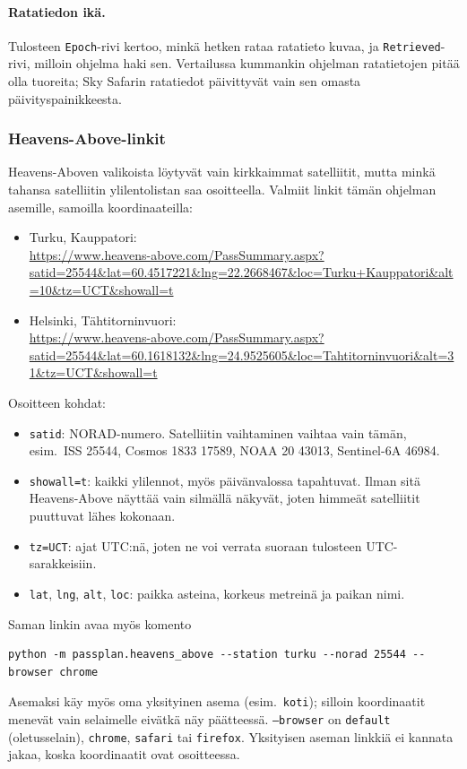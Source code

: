 \documentclass[a4paper,11pt]{article}
\newcommand{\koodi}[1]{\texttt{#1}}
\begin{document}
\paragraph{Ratatiedon ikä.} Tulosteen \koodi{Epoch}-rivi kertoo, minkä hetken rataa
ratatieto kuvaa, ja \koodi{Retrieved}-rivi, milloin ohjelma haki sen. Vertailussa kummankin
ohjelman ratatietojen pitää olla tuoreita; Sky Safarin ratatiedot päivittyvät vain sen omasta
päivityspainikkeesta.

\subsubsection*{Heavens-Above-linkit}
Heavens-Aboven valikoista löytyvät vain kirkkaimmat satelliitit, mutta minkä tahansa
satelliitin ylilentolistan saa osoitteella. Valmiit linkit tämän ohjelman asemille, samoilla
koordinaateilla:
\begin{itemize}
  \item Turku, Kauppatori:\\
    \url{https://www.heavens-above.com/PassSummary.aspx?satid=25544&lat=60.4517221&lng=22.2668467&loc=Turku+Kauppatori&alt=10&tz=UCT&showall=t}
  \item Helsinki, Tähtitorninvuori:\\
    \url{https://www.heavens-above.com/PassSummary.aspx?satid=25544&lat=60.1618132&lng=24.9525605&loc=Tahtitorninvuori&alt=31&tz=UCT&showall=t}
\end{itemize}
Osoitteen kohdat:
\begin{itemize}
  \item \koodi{satid}: NORAD-numero. Satelliitin vaihtaminen vaihtaa vain tämän, esim.\ ISS
    25544, Cosmos 1833 17589, NOAA 20 43013, Sentinel-6A 46984.
  \item \koodi{showall=t}: kaikki ylilennot, myös päivänvalossa tapahtuvat. Ilman sitä
    Heavens-Above näyttää vain silmällä näkyvät, joten himmeät satelliitit puuttuvat lähes
    kokonaan.
  \item \koodi{tz=UCT}: ajat UTC:nä, joten ne voi verrata suoraan tulosteen UTC-sarakkeisiin.
  \item \koodi{lat}, \koodi{lng}, \koodi{alt}, \koodi{loc}: paikka asteina, korkeus metreinä
    ja paikan nimi.
\end{itemize}
Saman linkin avaa myös komento
\begin{verbatim}
python -m passplan.heavens_above --station turku --norad 25544 --browser chrome
\end{verbatim}
Asemaksi käy myös oma yksityinen asema (esim.\ \koodi{koti}); silloin koordinaatit menevät
vain selaimelle eivätkä näy päätteessä. \koodi{--browser} on \koodi{default} (oletusselain),
\koodi{chrome}, \koodi{safari} tai \koodi{firefox}. Yksityisen aseman linkkiä ei kannata
jakaa, koska koordinaatit ovat osoitteessa.
\end{document}
